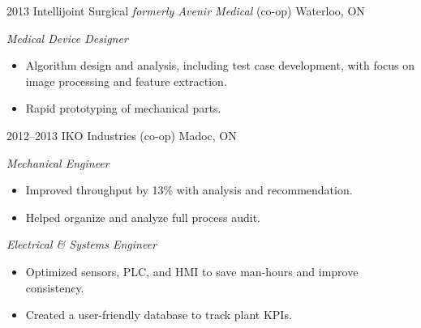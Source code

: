 \documentclass[a4paper,nocolors]{cv-friggeri-ben}
\begin{document}
\begin{entrylist}

\entry
    {2013}
    {Intellijoint Surgical {\normalfont \emph{formerly Avenir Medical} (co-op)}}
    {Waterloo, ON}
    {\emph{Medical Device Designer}
    \begin{itemize}
        \item Algorithm design and analysis, including test case development, with focus on image processing and feature extraction.
        \item Rapid prototyping of mechanical parts.
    \end{itemize}}

\entry
    {2012--2013}
    {IKO Industries {\normalfont (co-op)}}
    {Madoc, ON}
    {\emph{Mechanical Engineer}
    \begin{itemize}
        \item Improved throughput by 13\% with analysis and recommendation.
        \item Helped organize and analyze full process audit.
    \end{itemize}
    \emph{Electrical \& Systems Engineer}
    \begin{itemize}
        \item Optimized sensors, PLC, and HMI to save man-hours and improve consistency.
        \item Created a user-friendly database to track plant KPIs.
    \end{itemize}}

\end{entrylist}

\end{document}
